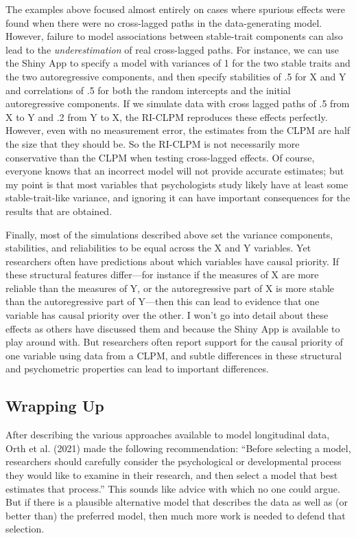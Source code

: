 \documentclass[
  english,
  man,floatsintext]{apa6}
\begin{document}
The examples above focused almost entirely on cases where spurious effects were found when there were no cross-lagged paths in the data-generating model. However, failure to model associations between stable-trait components can also lead to the \emph{underestimation} of real cross-lagged paths. For instance, we can use the Shiny App to specify a model with variances of 1 for the two stable traits and the two autoregressive components, and then specify stabilities of .5 for X and Y and correlations of .5 for both the random intercepts and the initial autoregressive components. If we simulate data with cross lagged paths of .5 from X to Y and .2 from Y to X, the RI-CLPM reproduces these effects perfectly. However, even with no measurement error, the estimates from the CLPM are half the size that they should be. So the RI-CLPM is not necessarily more conservative than the CLPM when testing cross-lagged effects. Of course, everyone knows that an incorrect model will not provide accurate estimates; but my point is that most variables that psychologists study likely have at least some stable-trait-like variance, and ignoring it can have important consequences for the results that are obtained.

Finally, most of the simulations described above set the variance components, stabilities, and reliabilities to be equal across the X and Y variables. Yet researchers often have predictions about which variables have causal priority. If these structural features differ---for instance if the measures of X are more reliable than the measures of Y, or the autoregressive part of X is more stable than the autoregressive part of Y---then this can lead to evidence that one variable has causal priority over the other. I won't go into detail about these effects as others have discussed them and because the Shiny App is available to play around with. But researchers often report support for the causal priority of one variable using data from a CLPM, and subtle differences in these structural and psychometric properties can lead to important differences.

\hypertarget{wrapping-up}{%
\subsection{Wrapping Up}\label{wrapping-up}}

After describing the various approaches available to model longitudinal data, Orth et al. (2021) made the following recommendation: ``Before selecting a model, researchers should carefully consider the psychological or developmental process they would like to examine in their research, and then select a model that best estimates that process.'' This sounds like advice with which no one could argue. But if there is a plausible alternative model that describes the data as well as (or better than) the preferred model, then much more work is needed to defend that selection.
\end{document}
